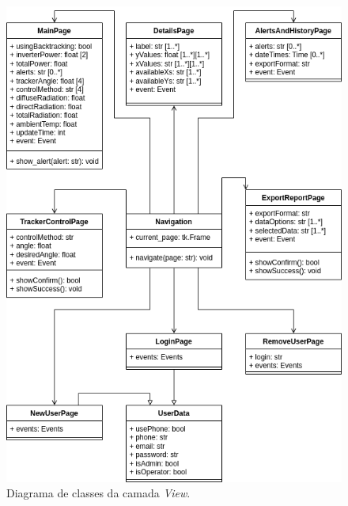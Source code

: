 \documentclass[a4paper,12pt]{article}
\begin{document}
\begin{figure}
    \centering
    \includegraphics[width=\linewidth]{diagrama de classes - view.drawio.png}
    \caption{Diagrama de classes da camada \textit{View}.}
    \label{fig:diagrama-classes-view}
\end{figure}
\end{document}
